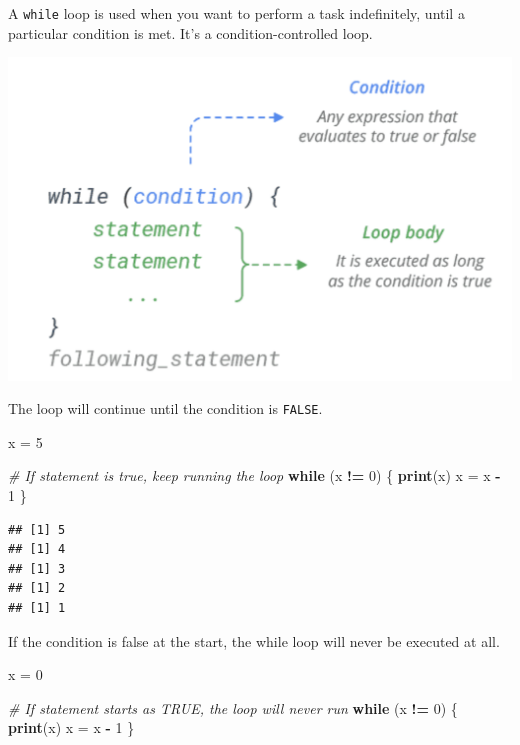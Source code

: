 \documentclass[
]{book}
\newenvironment{Shaded}{\begin{snugshade}}{\end{snugshade}}
\newcommand{\CommentTok}[1]{\textcolor[rgb]{0.56,0.35,0.01}{\textit{#1}}}
\newcommand{\ControlFlowTok}[1]{\textcolor[rgb]{0.13,0.29,0.53}{\textbf{#1}}}
\newcommand{\DecValTok}[1]{\textcolor[rgb]{0.00,0.00,0.81}{#1}}
\newcommand{\KeywordTok}[1]{\textcolor[rgb]{0.13,0.29,0.53}{\textbf{#1}}}
\newcommand{\NormalTok}[1]{#1}
\newcommand{\OperatorTok}[1]{\textcolor[rgb]{0.81,0.36,0.00}{\textbf{#1}}}
\newcommand{\StringTok}[1]{\textcolor[rgb]{0.31,0.60,0.02}{#1}}
\begin{document}
A \texttt{while} loop is used when you want to perform a task indefinitely, until a particular condition is met. It's a condition-controlled loop.

\begin{center}\includegraphics[width=14.5in]{images/WhileLoop} \end{center}

The loop will continue until the condition is \texttt{FALSE}.

\begin{Shaded}
\begin{Highlighting}[]
\NormalTok{x =}\StringTok{ }\DecValTok{5}

\CommentTok{# If statement is true, keep running the loop}
\ControlFlowTok{while}\NormalTok{ (x }\OperatorTok{!=}\StringTok{ }\DecValTok{0}\NormalTok{) \{}
    \KeywordTok{print}\NormalTok{(x)}
\NormalTok{    x =}\StringTok{ }\NormalTok{x }\OperatorTok{-}\StringTok{ }\DecValTok{1}
\NormalTok{\}}
\end{Highlighting}
\end{Shaded}

\begin{verbatim}
## [1] 5
## [1] 4
## [1] 3
## [1] 2
## [1] 1
\end{verbatim}

If the condition is false at the start, the while loop will never be executed at all.

\begin{Shaded}
\begin{Highlighting}[]
\NormalTok{x =}\StringTok{ }\DecValTok{0}

\CommentTok{# If statement starts as TRUE, the loop will never run}
\ControlFlowTok{while}\NormalTok{ (x }\OperatorTok{!=}\StringTok{ }\DecValTok{0}\NormalTok{) \{}
    \KeywordTok{print}\NormalTok{(x)}
\NormalTok{    x =}\StringTok{ }\NormalTok{x }\OperatorTok{-}\StringTok{ }\DecValTok{1}
\NormalTok{\}}
\end{Highlighting}
\end{Shaded}
\end{document}
